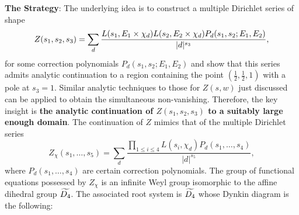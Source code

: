 \documentclass[12pt,reqno,oneside]{amsart}
\begin{document}
\textbf{The Strategy}: The underlying idea is to construct a multiple Dirichlet series of shape
\[
  Z(s_{1},s_{2},s_{3}) = \sum_{d}\frac{L(s_{1},E_{1} \times \chi_{d})L(s_{2},E_{2} \times \chi_{d})P_{d}(s_{1},s_{2};E_{1},E_{2})}{|d|^{s_{3}}},
\]
for some correction polynomials $P_{d}(s_{1},s_{2};E_{1},E_{2})$ and show that this series admits analytic continuation to a region containing the point $\left(\frac{1}{2},\frac{1}{2},1\right)$ with a pole at $s_{3} = 1$. Similar analytic techniques to those for $Z(s,w)$ just discussed can be applied to obtain the simultaneous non-vanishing. Therefore, the key insight is \textbf{the analytic continuation of $Z(s_{1},s_{2},s_{3})$ to a suitably large enough domain}. The continuation of $Z$ mimics that of the multiple Dirichlet series
\[
  Z_{\chi}(s_{1},\ldots,s_{5}) = \sum_{d}\frac{\prod_{1 \le i \le 4}L(s_{i},\chi_{d})P_{d}(s_{1},\ldots,s_{4})}{|d|^{s_{5}}},
\]
where $P_{d}(s_{1},\ldots,s_{4})$ are certain correction polynomials. The group of functional equations possessed by $Z_{\chi}$ is an infinite Weyl group isomorphic to the affine dihedral group $\widetilde{D_{4}}$. The associated root system is $\widetilde{D_{4}}$ whose Dynkin diagram is the following:

\begin{center}
\end{center}
\end{document}
